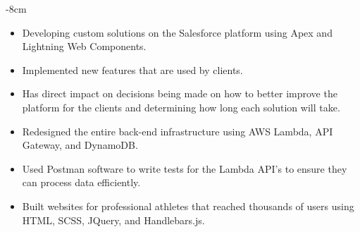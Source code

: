 \documentclass[10pt,a4paper,ragged2e]{altacv}
\begin{document}



\begin{adjustwidth}{}{-8cm}
\makecvheader
\end{adjustwidth}




\begin{itemize}
\item  Developing custom solutions on the Salesforce platform using Apex and Lightning Web Components.
\item Implemented new features that are used by clients.
\item Has direct impact on decisions being made on how to better improve the platform for the clients and determining how long each solution will take.

\end{itemize}

\divider

\begin{itemize}
    \item Redesigned the entire back-end infrastructure using AWS Lambda, API Gateway, and DynamoDB.
    \item Used Postman software to write tests for the Lambda API's to ensure they can process data efficiently.
    \item Built websites for professional athletes that reached thousands of users using HTML, SCSS, JQuery, and Handlebars.js.
\end{itemize}
\end{document}
